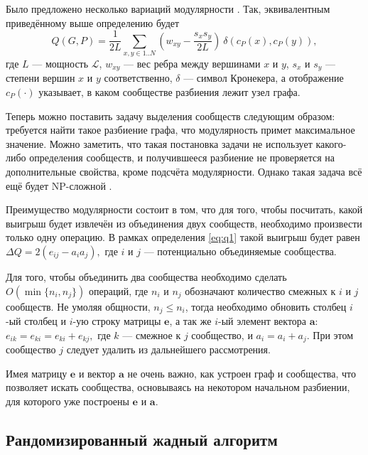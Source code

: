 Было предложено несколько вариаций модулярности \cite{Muff&Rao&Caflisch:2005, Fortunato&Barthelemy:2007}. Так, эквивалентным приведённому выше определению будет
\begin{equation}
Q(G, P) = \frac{1}{2L} \sum_{x, y \in 1..N} \left(w_{xy} - \frac{s_x s_y}{2L}\right)\ \delta(c_P(x), c_P(y)),
\end{equation}
где $L$ --- мощность $\mathscr{L}$, $w_{xy}$ --- вес ребра между вершинами $x$ и $y$, $s_x$ и $s_y$ --- степени вершин $x$ и $y$ соответственно, $\delta$ --- символ Кронекера, а отображение $c_P(\cdot)$ указывает, в каком сообществе разбиения лежит узел графа.

Теперь можно поставить задачу выделения сообществ следующим образом: требуется найти такое разбиение графа, что модулярность примет максимальное значение. Можно заметить, что такая постановка задачи не использует какого-либо определения сообществ, и получившееся разбиение не проверяется на дополнительные свойства, кроме подсчёта модулярности. Однако такая задача всё ещё будет NP-сложной \cite{Brandes&al:2008}.

Преимущество модулярности состоит в том, что для того, чтобы посчитать, какой выигрыш будет извлечён из объединения двух сообществ, необходимо произвести только одну операцию. В рамках определения \eqref{eq:q1} такой выигрыш будет равен $\Delta Q = 2(e_{ij} - a_i a_j),$ где $i$ и $j$ --- потенциально объединяемые сообщества.

Для того, чтобы объединить два сообщества необходимо сделать $O(\min\{n_i, n_j\})$ операций, где $n_i$ и $n_j$ обозначают количество смежных к $i$ и $j$ сообществ. Не умоляя общности, $n_j \leq n_i$, тогда необходимо обновить столбец $i$-ый столбец и $i$-ую строку матрицы $\mathbf{e}$, а так же $i$-ый элемент вектора $\mathbf{a}$: $e_{ik} = e_{ki} = e_{ki} + e_{kj},$ где $k$ --- смежное к $j$ сообщество, и $a_{i} = a_{i} + a_{j}$. При этом сообщество $j$ следует удалить из дальнейшего рассмотрения.

Имея матрицу $\mathbf{e}$ и вектор $\mathbf{a}$ не очень важно, как устроен граф и сообщества, что позволяет искать сообщества, основываясь на некотором начальном разбиении, для которого уже построены $\mathbf{e}$ и $\mathbf{a}$.



\subsection{Рандомизированный жадный алгоритм}

